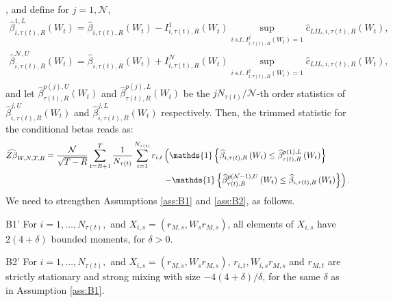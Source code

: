 , and define for $j=1, \mathcal{N}$,
\begin{align*}
	\widehat{\beta}_{i,\tau(t),R}^{1,L} \left( W_t \right) = \widehat{\beta}_{i,\tau(t),R} \left( W_t \right) - I_{i,\tau(t),R}^1\left( W_t \right) \sup_{i \ s.t. \ I_{i,\tau(t),R}^j\left( W_t \right)=1} \widehat{c}_{LIL,i,\tau(t),R}\left( W_t \right),
\end{align*}
\begin{align*}
	\widehat{\beta}_{i,\tau(t),R}^{\mathcal{N},U} \left( W_t \right) = \widehat{\beta}_{i,\tau(t),R} \left( W_t \right) + I_{i,\tau(t),R}^\mathcal{N}\left( W_t \right) \sup_{i \ s.t. \ I_{i,\tau(t),R}^j\left( W_t \right)=1} \widehat{c}_{LIL,i,\tau(t),R}\left( W_t \right),
\end{align*}
and let $\widehat{\beta}_{\tau(t),R}^{p(j),U} \left( W_t \right)$ and $\widehat{\beta}_{\tau(t),R}^{p(j),L} \left( W_t \right)$ be the $jN_{\tau(t)}/\mathcal{N}$-th order statistics of $\widehat{\beta}_{i,\tau(t),R}^{j,U} \left( W_t \right)$ and $\widehat{\beta}_{i,\tau(t),R}^{j,L} \left( W_t \right)$ respectively. Then, the trimmed statistic for the conditional betas reads as:
\begin{align}
    \widehat{Z\beta}_{W,N,T,R} = \frac{\mathcal{N}}{\sqrt{T-R}}\sum_{t=R+1}^{T}\frac{1}{N_{\tau(t)}}\sum_{i=1}^{N_{\tau(t)}}r_{i,t} &\left( \mathds{1}\left\{ \widehat{\beta }_{i,\tau(t),R}\left( W_t\right) \leq \widehat{\beta }_{\tau(t),R}^{p(1),L}\left( W_t\right) \right\} \right. \notag \\
    &\left. -\mathds{1}\left\{ \widehat{\beta}_{\tau(t),R}^{p(\mathcal{N}-1),U}\left( W_t\right) \leq \widehat{\beta }_{i,\tau(t),R}\left( W_t\right) \right\} \right). \label{ZbetaW}
\end{align}
We need to strengthen Assumptions \ref{ass:B1} and \ref{ass:B2}, as follows.

\begin{namedassumption}{B1'}\label{ass:B1'}
    For $i=1,\ldots ,N_{\tau(t)},$ and $X_{i,s}=\left( r_{M,s},W_s r_{M,s}\right)$, all elements of $X_{i,s}$ have $2\left( 4+\delta \right)$ bounded moments, for $\delta >0$.
\end{namedassumption}
\begin{namedassumption}{B2'}\label{ass:B2'}
    For $i=1,\ldots ,N_{\tau(t)},$ and $X_{i,s}=\left( r_{M,s},W_s r_{M,s}\right)$, $r_{i,t},W_{i,s}r_{M,s}$ and $r_{M,t}$ are strictly stationary and strong mixing with size $-4(4+\delta )/\delta$, for the same $\delta $ as in Assumption \ref{ass:B1}.
\end{namedassumption}

